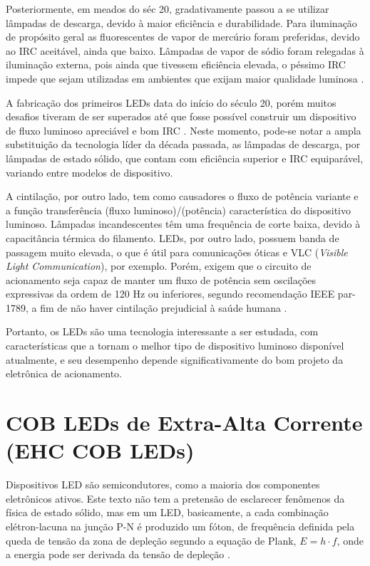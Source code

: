 \documentclass[
        12pt,
        openany, %
        oneside, %
        a4paper,			
        english,			
        brazil
        ]{abntbibufjf}
\begin{document}
Posteriormente, em meados do séc 20, gradativamente passou a se utilizar lâmpadas de descarga, devido à maior eficiência e durabilidade. Para iluminação de propósito geral as fluorescentes de vapor de mercúrio foram preferidas, devido ao IRC aceitável, ainda que baixo. Lâmpadas de vapor de sódio foram relegadas à iluminação externa, pois ainda que tivessem eficiência elevada, o péssimo IRC impede que sejam utilizadas em ambientes que exijam maior qualidade luminosa \cite{led-2}.

A fabricação dos primeiros LEDs data do início do século 20, porém muitos desafios tiveram de ser superados até que fosse possível construir um dispositivo de fluxo luminoso apreciável e bom IRC \cite{led-3}. Neste momento, pode-se notar a ampla substituição da tecnologia líder da década passada, as lâmpadas de descarga, por lâmpadas de estado sólido, que contam com eficiência superior e IRC equiparável, variando entre modelos de dispositivo.

A cintilação, por outro lado, tem como causadores o fluxo de potência variante e a função transferência (fluxo luminoso)/(potência) característica do dispositivo luminoso. Lâmpadas incandescentes têm uma frequência de corte baixa, devido à capacitância térmica do filamento. LEDs, por outro lado, possuem banda de passagem muito elevada, o que é útil para comunicações óticas e VLC (\textit{Visible Light Communication}), por exemplo. Porém, exigem que o circuito de acionamento seja capaz de manter um fluxo de potência sem oscilações expressivas da ordem de 120 Hz ou inferiores, segundo recomendação IEEE par-1789, a fim de não haver cintilação prejudicial à saúde humana \cite{ieee-flicker}.

Portanto, os LEDs são uma tecnologia interessante a ser estudada, com características que a tornam o melhor tipo de dispositivo luminoso disponível atualmente, e seu desempenho depende significativamente do bom projeto da eletrônica de acionamento.

\section{COB LEDs de Extra-Alta Corrente (EHC COB LEDs)}

Dispositivos LED são semicondutores, como a maioria dos componentes eletrônicos ativos. Este texto não tem a pretensão de esclarecer fenômenos da física de estado sólido, mas em um LED, basicamente, a cada combinação elétron-lacuna na junção P-N é produzido um fóton, de frequência definida pela queda de tensão da zona de depleção segundo a equação de Plank, $E=h\cdot f$, onde a energia pode ser derivada da tensão de depleção \cite{schubert}.
\end{document}
